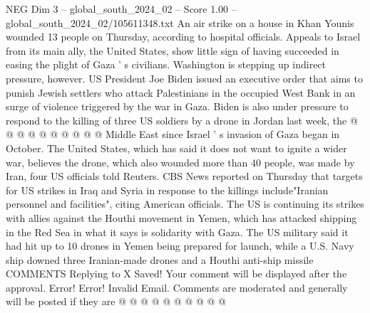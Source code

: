 \begin{textsample}{NEG Dim 3 – global\_south\_2024\_02 – Score 1.00 – global\_south\_2024\_02/105611348.txt}
An air strike on a house in Khan Younis wounded 13 people on Thursday, according to hospital officials.
Appeals to Israel from its main ally, the United States, show little sign of having succeeded in easing the plight of Gaza ' s civilians.
Washington is stepping up indirect pressure, however.
US President Joe Biden issued an executive order that aims to punish Jewish settlers who attack Palestinians in the occupied West Bank in an surge of violence triggered by the war in Gaza.
Biden is also under pressure to respond to the killing of three US soldiers by a drone in Jordan last week, the @ @ @ @ @ @ @ @ @ @ Middle East since Israel ' s invasion of Gaza began in October.
The United States, which has said it does not want to ignite a wider war, believes the drone, which also wounded more than 40 people, was made by Iran, four US officials told Reuters.
CBS News reported on Thursday that targets for US strikes in Iraq and Syria in response to the killings include"Iranian personnel and facilities", citing American officials.
The US is continuing its strikes with allies against the Houthi movement in Yemen, which has attacked shipping in the Red Sea in what it says is solidarity with Gaza.
The US military said it had hit up to 10 drones in Yemen being prepared for launch, while a U.S.
Navy ship downed three Iranian-made drones and a Houthi anti-ship missile COMMENTS Replying to X Saved!
Your comment will be displayed after the approval.
Error!
Error!
Invalid Email.
Comments are moderated and generally will be posted if they are @ @ @ @ @ @ @ @ @ @

\end{textsample}
